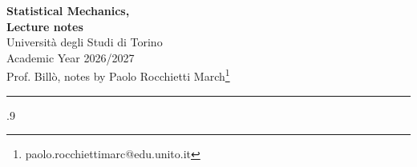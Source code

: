 \documentclass[a4paper,11pt]{article}
\begin{document}
\begin{center}
\Large{\textbf{Statistical Mechanics,\\Lecture notes}}
\vspace{0.4cm}
\normalsize
\\ Università degli Studi di Torino\\Academic Year 2026/2027 \\Prof. Billò,
notes by Paolo Rocchietti March\footnote{paolo.rocchiettimarc@edu.unito.it} \\

\vspace{0.1cm}
\medskip
\normalsize
\end{center}
\vspace{0.4cm}
{\color{gray}\hrule}
\null\vfill
\vfill\null
\newpage
\begin{spacing}{.9}
\tableofcontents
\end{spacing}
\newpage
\pagestyle{fancy}
\thispagestyle{fancy}
\fancyfoot[C]{\small{\thepage}}
















\end{document}
